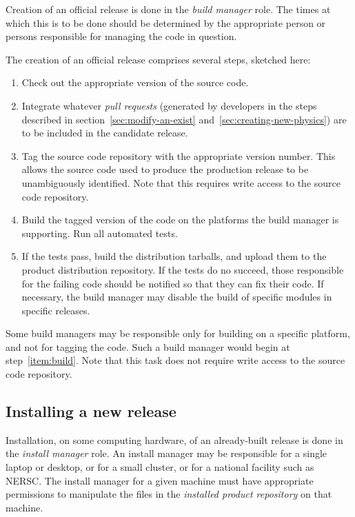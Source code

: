 \documentclass[draftmode,draftwater]{memarticle}
\begin{document}
Creation of an official release is done in the \emph{build manager}
role. The times at which this is to be done should be determined by the
appropriate person or persons responsible for managing the code in
question.

The creation of an official release comprises several steps, sketched
here:
\begin{enumerate}
\item Check out the appropriate version of the source code.
\item Integrate whatever \emph{pull requests} (generated by developers
  in the steps described in
  section~\ref{sec:modify-an-exist}
  and~\ref{sec:creating-new-physics}) are to be included in the
  candidate release.
\item Tag the source code repository with the appropriate version
  number. This allows the source code used to produce the production
  release to be unambiguously identified. Note that this requires write
  access to the source code repository.
\item \label{item:build} Build the tagged version of the code on the
  platforms the build manager is supporting. Run all automated tests.
\item If the tests pass, build the distribution tarballs, and upload
  them to the product distribution repository. If the tests do no
  succeed, those responsible for the failing code should be notified so
  that they can fix their code. If necessary, the build manager may
  disable the build of specific modules in specific releases.
\end{enumerate}

Some build managers may be responsible only for building on a specific
platform, and not for tagging the code. Such a build manager would begin
at step~\ref{item:build}. Note that this task does not require write
access to the source code repository.

\subsection{Installing a new release}

Installation, on some computing hardware, of an already-built release is
done in the \emph{install manager} role. An install manager may be
responsible for a single laptop or desktop, or for a small cluster, or
for a national facility such as NERSC. The install manager for a given
machine must have appropriate permissions to manipulate the files in the
\emph{installed product repository} on that machine.
\end{document}
